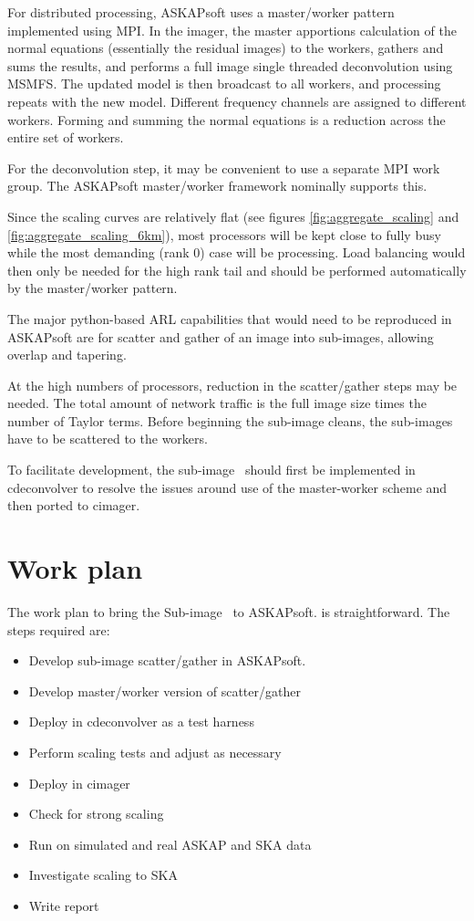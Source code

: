 \documentclass[11pt,a4paper,variablewidth]{article}
\begin{document}
For distributed processing, ASKAPsoft uses a master/worker pattern implemented using MPI. In the imager, the master apportions calculation of the normal equations (essentially the residual images) to the workers, gathers and sums the results, and performs a full image single threaded deconvolution using MSMFS. The updated model is then broadcast to all workers, and processing repeats with the new model. Different frequency channels are assigned to different workers. Forming and summing the normal equations is a reduction across the entire set of workers.

For the deconvolution step, it may be convenient to use a separate MPI work group. The ASKAPsoft master/worker framework nominally supports this.

Since the scaling curves are relatively flat (see figures \ref{fig:aggregate_scaling} and \ref{fig:aggregate_scaling_6km}), most processors will be kept close to fully busy while the most demanding (rank 0) case will be processing. Load balancing would then only be needed for the high rank tail and should be performed automatically by the master/worker pattern.

The major python-based ARL capabilities that would need to be reproduced in ASKAPsoft are for scatter and gather of an image into sub-images, allowing overlap and tapering. 

At the high numbers of processors, reduction in the scatter/gather steps may be needed. The total amount of network traffic is the full image size times the number of Taylor terms. Before beginning the sub-image cleans, the sub-images have to be scattered to the workers. 

To facilitate development, the sub-image \MAM\ should first be implemented in cdeconvolver to resolve the issues around use of the master-worker scheme and then ported to cimager.
	
\pagebreak
\section{Work plan}

The work plan to bring the Sub-image \MAM\ to ASKAPsoft. is straightforward. The steps required are:

\begin{itemize}
	\item Develop sub-image scatter/gather in ASKAPsoft.
	\item Develop master/worker version of scatter/gather
	\item Deploy in cdeconvolver as a test harness
	\item Perform scaling tests and adjust as necessary
	\item Deploy in cimager
	\item Check for strong scaling
	\item Run on simulated and real ASKAP and SKA data
	\item Investigate scaling to SKA
	\item Write report
\end{itemize}
\end{document}
